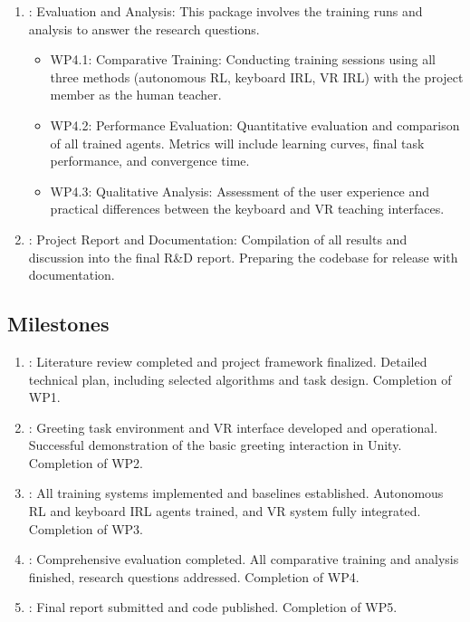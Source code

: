 \documentclass[rnd]{mas_proposal}
\begin{document}
\begin{enumerate}
\begin{itemize}
    \end{itemize}
    \item [WP4]: Evaluation and Analysis: This package involves the training runs and analysis to answer the research questions.
        \begin{itemize}
        \item WP4.1: Comparative Training: Conducting training sessions using all three methods (autonomous RL, keyboard IRL, VR IRL) with the project member as the human teacher.
        \item WP4.2: Performance Evaluation: Quantitative evaluation and comparison of all trained agents. Metrics will include learning curves, final task performance, and convergence time.
        \item WP4.3: Qualitative Analysis: Assessment of the user experience and practical differences between the keyboard and VR teaching interfaces.
    \end{itemize}
    \item [WP5]: Project Report and Documentation: Compilation of all results and discussion into the final R\&D report. Preparing the codebase for release with documentation.
\end{enumerate}

\subsection{Milestones}

\begin{enumerate}
     \item [M1]: Literature review completed and project framework finalized. Detailed technical plan, including selected algorithms and task design. Completion of WP1.
     \item [M2]: Greeting task environment and VR interface developed and operational. Successful demonstration of the basic greeting interaction in Unity. Completion of WP2.
     \item [M3]: All training systems implemented and baselines established. Autonomous RL and keyboard IRL agents trained, and VR system fully integrated. Completion of WP3.
     \item [M4]: Comprehensive evaluation completed. All comparative training and analysis finished, research questions addressed. Completion of WP4.
     \item [M5]: Final report submitted and code published. Completion of WP5.
\end{enumerate}
\end{document}
